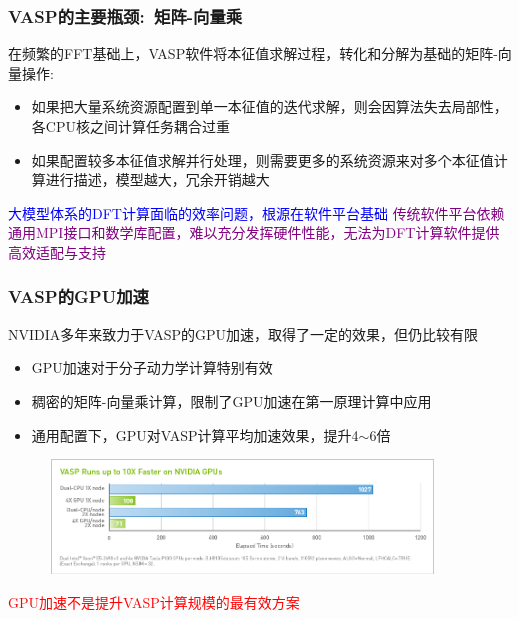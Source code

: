 \begin{frame}
	\frametitle{\textrm{VASP}的主要瓶颈:~矩阵-向量乘}
在频繁的\textrm{FFT}基础上，\textrm{VASP}软件将本征值求解过程，转化和分解为基础的矩阵-向量操作:\\
{\fontsize{7.2pt}{5.2pt}}
	\begin{itemize}
		\item 如果把大量系统资源配置到单一本征值的迭代求解，则会因算法失去局部性，各\textrm{CPU}核之间计算任务耦合过重\\
	{\fontsize{7.2pt}{5.2pt}\selectfont{可能造成系统过载}}
		\item 如果配置较多本征值求解并行处理，则需要更多的系统资源来对多个本征值计算进行描述，模型越大，冗余开销越大\\
			{\fontsize{7.2pt}{5.2pt}\selectfont{可能影响软件的实用性，甚至超过了现有计算机集群的处理极限}}
	\end{itemize}
	{\textcolor{blue}{大模型体系的\textrm{DFT}计算面临的效率问题，根源在软件平台基础}}
	\vskip 2pt
	{\textcolor{purple}{传统软件平台依赖通用\textrm{MPI}接口和数学库配置，难以充分发挥硬件性能，无法为\textrm{DFT}计算软件提供高效适配与支持}}
\end{frame}

\frame
{
	\frametitle{\textrm{VASP}的\textrm{GPU}加速}
\textrm{NVIDIA}多年来致力于\textrm{VASP}的\textrm{GPU}加速，取得了一定的效果，但仍比较有限
\begin{itemize}
	\item \textrm{GPU}加速对于分子动力学计算特别有效
	\item 稠密的矩阵-向量乘计算，限制了\textrm{GPU}加速在第一原理计算中应用
	\item 通用配置下，\textrm{GPU}对\textrm{VASP}计算平均加速效果，提升\textrm{4$\sim$6}倍
\end{itemize}
\begin{figure}[h!]
	\vspace{-0.15in}
\centering
\includegraphics[height=1.2in,width=4.05in,viewport=0 0 850 260,clip]{Figures/VASP-GPU-CPU.png}
\label{VASP_GPU}
\end{figure} 
	\vspace{-0.15in}
\textcolor{red}{\textrm{GPU}加速不是提升\textrm{VASP}计算规模的最有效方案}
}

